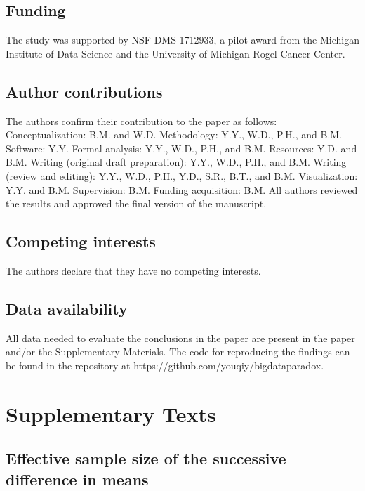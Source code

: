\documentclass{article}
\begin{document}
\subsection{Funding}

The study was supported by NSF DMS 1712933, a pilot award from the Michigan Institute of Data Science and the University of Michigan Rogel Cancer Center.

\subsection{Author contributions}

The authors confirm their contribution to the paper as follows: Conceptualization: B.M. and W.D. Methodology: Y.Y., W.D., P.H., and B.M. Software: Y.Y. Formal analysis: Y.Y., W.D., P.H., and B.M. Resources: Y.D.  and B.M. Writing (original draft preparation): Y.Y., W.D., P.H., and B.M. Writing (review and editing): Y.Y., W.D., P.H., Y.D., S.R., B.T., and B.M. Visualization: Y.Y. and B.M. Supervision: B.M. Funding acquisition: B.M. All authors reviewed the results and approved the final version of the manuscript. 

\subsection{Competing interests}

The authors declare that they have no competing interests.

\subsection{Data availability}

All data needed to evaluate the conclusions in the paper are present in the paper and/or the Supplementary Materials. The code for reproducing the findings can be found in the repository at https://github.com/youqiy/bigdataparadox.

\pagebreak

\section{Supplementary Texts}

\subsection{Effective sample size of the successive difference in means}
\end{document}
